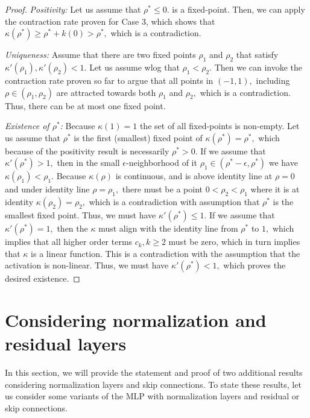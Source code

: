 \documentclass[twoside]{article}
\theoremstyle{definition}
\begin{document}
\begin{proof}
\textit{Positivity:} Let us assume that $\rho^* \le 0.$ is a fixed-point. Then, we can apply the contraction rate proven for Case 3, which shows that $\kappa(\rho^*)\ge \rho^* + k(0) > \rho^*,$ which is a contradiction.


\textit{Uniqueness:} Assume that there are two fixed points $\rho_1$ and $\rho_2$ that satisfy $\kappa'(\rho_1),\kappa'(\rho_2)<1.$ Let us assume wlog that $\rho_1 < \rho_2.$ Then we can invoke the contraction rate proven so far to argue that all points in $(-1,1),$ including  $\rho\in (\rho_1,\rho_2)$ are attracted towards both $\rho_1$ and $\rho_2,$ which is a contradiction. Thus, there can be at most one fixed point.

\textit{Existence of $\rho^*$:} Because $\kappa(1)=1$ the set of all fixed-points is non-empty. Let us assume that $\rho^*$ is the first (smallest) fixed point of $\kappa(\rho^*) = \rho^*,$ which because of the positivity result is necessarily $\rho^*>0.$ If we assume that $\kappa'(\rho^*) > 1,$ then in the small $\epsilon$-neighborhood of it $\rho_1 \in(\rho^*-\epsilon,\rho^*)$ we have $\kappa(\rho_1) < \rho_1.$ Because $\kappa(\rho)$ is continuous, and is above identity line at $\rho=0$ and under identity line $\rho=\rho_1,$ there must be a point $0 < \rho_2 < \rho_1$ where it is at identity $\kappa(\rho_2) = \rho_2,$ which is a contradiction with assumption that $\rho^*$ is the smallest fixed point. Thus, we must have $\kappa'(\rho^*) \le 1.$ If we assume that $\kappa'(\rho^*) = 1,$ then the $\kappa$ must align with the identity line from $\rho^*$ to $1,$ which implies that all higher order terms $c_k,k\ge 2$ must be zero, which in turn implies that $\kappa$ is a linear function. This is a contradiction with the assumption that the activation is non-linear. Thus, we must have $\kappa'(\rho^*) < 1,$ which proves the desired existence. 
\end{proof}

\section{Considering normalization and residual layers}

In this section, we will provide the statement and proof of two additional results considering normalization layers and skip connections. To state these results, let us consider some variants of the MLP with normalization layers and residual or skip connections. 
\end{document}
